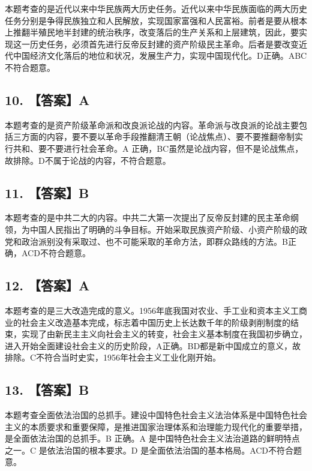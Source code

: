 \documentclass[UTF8,11pt]{ctexart}
\begin{document}
本题考查的是近代以来中华民族两大历史任务。近代以来中华民族面临的两大历史任务分别是争得民族独立和人民解放，实现国家富强和人民富裕。前者是要从根本上推翻半殖民地半封建的统治秩序，改变落后的生产关系和上层建筑，因此，要实现这一历史任务，必须首先进行反帝反封建的资产阶级民主革命。后者是要改变近代中国经济文化落后的地位和状况，发展生产力，实现中国现代化。D正确。ABC不符合题意。


\subsection*{10. 【答案】A}

本题考查的是资产阶级革命派和改良派论战的内容。革命派与改良派的论战主要包括三方面的内容，要不要以革命手段推翻清王朝（论战焦点）、要不要推翻帝制实行共和、要不要进行社会革命。A 正确，BC虽然是论战内容，但不是论战焦点，故排除。D不属于论战的内容，不符合题意。


\subsection*{11. 【答案】B}

本题考查的是中共二大的内容。中共二大第一次提出了反帝反封建的民主革命纲领，为中国人民指出了明确的斗争目标。开始采取民族资产阶级、小资产阶级的政党和政治派别没有采取过、也不可能采取的革命方法，即群众路线的方法。B正确，ACD不符合题意。


\subsection*{12. 【答案】A}

本题考查的是三大改造完成的意义。1956年底我国对农业、手工业和资本主义工商业的社会主义改造基本完成，标志着中国历史上长达数千年的阶级剥削制度的结束，实现了由新民主主义向社会主义的转变，社会主义基本制度在我国初步确立，进入开始全面建设社会主义的历史阶段，A正确。BD都是新中国成立的意义，故排除。C不符合当时史实，1956年社会主义工业化刚开始。


\subsection*{13. 【答案】B}

本题考查全面依法治国的总抓手。建设中国特色社会主义法治体系是中国特色社会主义的本质要求和重要保障，是推进国家治理体系和治理能力现代化的重要举措，是全面依法治国的总抓手。B 正确。A 是中国特色社会主义法治道路的鲜明特点之一。C 是依法治国的根本要求。D 是全面依法治国的基本格局。ACD不符合题意。
\end{document}
